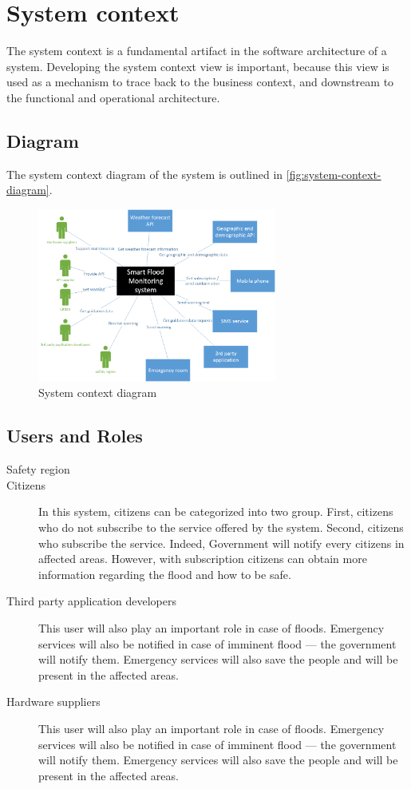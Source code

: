 \section{System context}
The system context is a fundamental artifact in the software architecture of a system. Developing the system context view is important, because this view is used as a mechanism to trace back to the business context, and downstream to the functional and operational architecture.

\subsection{Diagram}
The system context diagram of the system is outlined in \autoref{fig:system-context-diagram}.

\begin{figure}[H]
\centering
\includegraphics[keepaspectratio=true,width=0.7\textwidth]{images/system_context.png}
\caption{System context diagram}
\label{fig:system-context-diagram}
\end{figure}

\subsection{Users and Roles}
\begin{description}
	\item[Safety region] 
	\item[Citizens] In this system, citizens can be categorized into two group. First, citizens who do not subscribe to the service offered by the system. Second, citizens who subscribe the service. Indeed, Government will notify every citizens in affected areas. However, with subscription citizens can obtain more information regarding the flood and how to be safe.
	\item[Third party application developers] This user will also play an important role in case of floods. Emergency services will also be notified in case of imminent flood --- the government will notify them. Emergency services will also save the people and will be present in the affected areas.
	\item[Hardware suppliers] This user will also play an important role in case of floods. Emergency services will also be notified in case of imminent flood --- the government will notify them. Emergency services will also save the people and will be present in the affected areas.
\end{description} 


